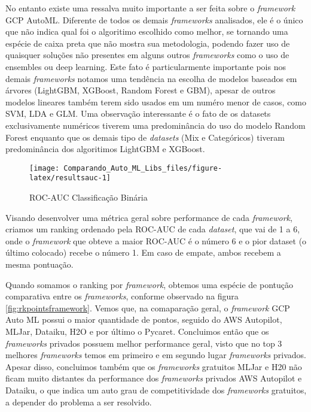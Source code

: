 \documentclass[9pt, a4paper, twocolumn]{article}
\begin{document}
No entanto existe uma ressalva muito importante a ser feita sobre o \emph{framework} GCP AutoML. Diferente de todos os demais \emph{frameworks} analisados, ele é o único que não indica qual foi o algoritimo escolhido como melhor, se tornando uma espécie de caixa preta que não mostra sua metodologia, podendo fazer uso de quaisquer soluções não presentes em alguns outros \emph{frameworks} como o uso de ensembles ou deep learning. Este fato é particularmente importante pois nos demais \emph{frameworks} notamos uma tendência na escolha de modelos baseados em árvores (LightGBM, XGBoost, Random Forest e GBM), apesar de outros modelos lineares também terem sido usados em um numéro menor de casos, como SVM, LDA e GLM. Uma observação interessante é o fato de os datasets exclusivamente numéricos tiverem uma predominância do uso do modelo Random Forest enquanto que os demais tipo de \emph{datasets} (Mix e Categóricos) tiveram predominância dos algoritimos LightGBM e XGBoost.

\begin{figure}[h]

{\centering \texttt{[image: Comparando\_Auto\_ML\_Libs\_files/figure-latex/resultsauc-1]} 

}

\caption{ROC-AUC Classificação Binária}\label{fig:resultsauc}
\end{figure}

Visando desenvolver uma métrica geral sobre performance de cada \emph{framework}, criamos um ranking ordenado pela ROC-AUC de cada \emph{dataset}, que vai de 1 a 6, onde o \emph{framework} que obteve a maior ROC-AUC é o número 6 e o pior dataset (o último colocado) recebe o número 1. Em caso de empate, ambos recebem a mesma pontuação.

Quando somamos o ranking por \emph{framework}, obtemos uma espécie de pontução comparativa entre os \emph{frameworks}, conforme observado na figura \ref{fig:rkpointsframework}. Vemos que, na comaparação geral, o \emph{framework} GCP Auto ML possui o maior quantidade de pontos, seguido do AWS Autopilot, MLJar, Dataiku, H2O e por último o Pycaret. Concluimos então que os \emph{frameworks} privados possuem melhor performance geral, visto que no top 3 melhores \emph{frameworks} temos em primeiro e em segundo lugar \emph{frameworks} privados. Apesar disso, concluimos também que os \emph{frameworks} gratuitos MLJar e H20 não ficam muito distantes da performance dos \emph{frameworks} privados AWS Autopilot e Dataiku, o que indica um auto grau de competitividade dos \emph{frameworks} gratuitos, a depender do problema a ser resolvido.
\end{document}
